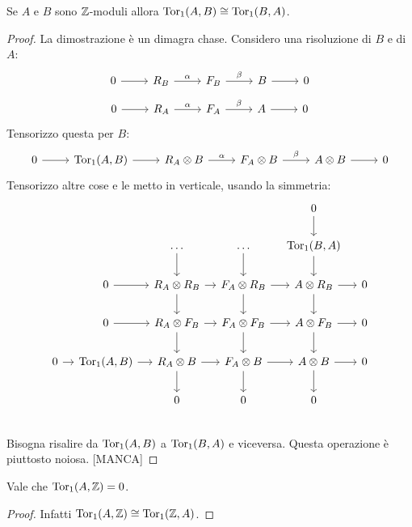 \begin{proposition}
  Se $ A $ e $ B $ sono $ \mathbb{Z} $-moduli allora $ \mathrm{Tor_1}( A,B) \cong \mathrm{Tor_1}( B,A) $.
\end{proposition}
\begin{proof}
  La dimostrazione è un dimagra chase.
  Considero una risoluzione di $ B $ e di $ A $:
  \[
    \begin{tikzcd}
      0 \rar{} & R_B \rar{\alpha} & F_B \rar{\beta} & B \rar & 0
    \end{tikzcd}
  \]
  \[
    \begin{tikzcd}
      0 \rar{} & R_A \rar{\alpha} & F_A \rar{\beta} & A \rar & 0
    \end{tikzcd}
  \]
  Tensorizzo questa per $ B $:
  \[
    \begin{tikzcd}
      0 \rar{} & \tor{A,B} \rar & R_A \otimes B \rar{\alpha} & F_A \otimes B \rar{\beta} & A \otimes B \rar & 0
    \end{tikzcd}
  \]
  Tensorizzo altre cose e le metto in verticale, usando la simmetria:
  \[
    \begin{tikzcd}[nodes={column sep= 10 pt}]
      {} & {} & {} & {} & 0 \dar & {} \\
      {} & {} & \dots \dar & \dots \dar & \tor{B,A} \dar & {} \\
      {} & 0 \rar & R_A \otimes R_B \rar \dar & F_A \otimes R_B \dar \rar & A \otimes R_B \dar  \rar & 0 \\
      {} & 0 \rar & R_A \otimes F_B \rar \dar & F_A \otimes F_B \dar \rar & A \otimes F_B \dar  \rar & 0 \\
      0 \rar & \tor{A,B} \rar & R_A \otimes B \rar \dar & F_A \otimes B \rar \dar & A \otimes B  \rar \dar & 0 \\
      {} & {} & 0 & 0 & 0 & {} \\
    \end{tikzcd}
  \]
  Bisogna risalire da $ \mathrm{Tor_1}( A,B) $ a $ \mathrm{Tor_1}( B,A) $ e viceversa. Questa operazione è piuttosto
  noiosa. [MANCA]
\end{proof}

\begin{corollary}
  Vale che $ \mathrm{Tor_1}( A, \mathbb{Z}) = 0 $.
\end{corollary}
\begin{proof}
  Infatti $ \mathrm{Tor_1}( A, \mathbb{Z}) \cong \mathrm{Tor_1}( \mathbb{Z}, A) $.
\end{proof}

